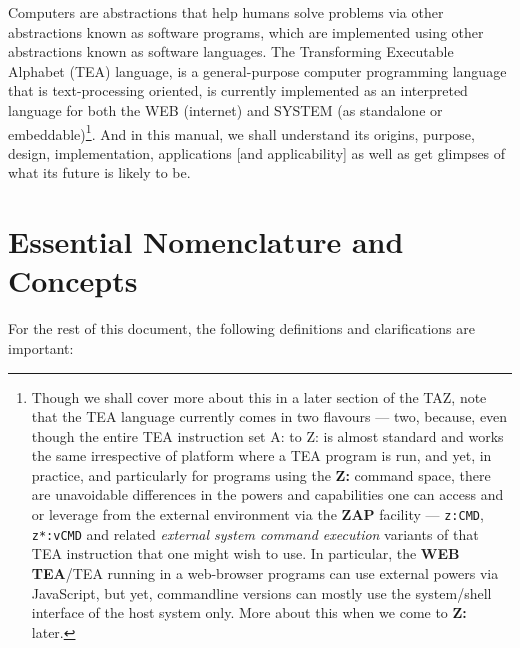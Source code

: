 \documentclass[a4paper, 18pt]{book} %
\begin{document}
Computers are abstractions that help humans solve problems via other abstractions known as software programs, which are implemented using other abstractions known as software languages. The Transforming Executable Alphabet (TEA) language, is a general-purpose computer programming language that is text-processing oriented, is currently implemented as an interpreted language for both the WEB (internet) and SYSTEM (as standalone or embeddable)\footnote{Though we shall cover more about this in a later section of the TAZ, note that the TEA language currently comes in two flavours --- two, because, even though the entire TEA instruction set A: to Z: is almost standard and works the same irrespective of platform where a TEA program is run, and yet, in practice, and particularly for programs using the \textbf{Z:} command space, there are unavoidable differences in the powers and capabilities one can access and or leverage from the external environment via the \textbf{ZAP} facility --- \texttt{z:CMD}, \texttt{z*:vCMD} and related \textit{external system command execution} variants of that TEA instruction that one might wish to use. In particular, the \textbf{WEB TEA}/TEA running in a web-browser programs can use external powers via JavaScript, but yet, commandline versions can mostly use the system/shell interface of the host system only. More about this when we come to \textbf{Z:} later.}. And in this manual, we shall understand its origins, purpose, design, implementation, applications [and applicability] as well as get glimpses of what its future is likely to be.

\section{Essential Nomenclature and Concepts}
\label{SECNOMEN}

For the rest of this document, the following definitions and clarifications are important:\\
\end{document}
